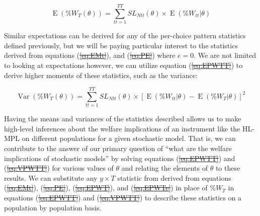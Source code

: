 \documentclass[11pt,a4paper]{report}
\newcommand{\E}{\operatorname{E}}           %
\newcommand{\Var}{\operatorname{Var}}       %
\providecommand{\DIFaddtex}[1]{{\protect\color{blue}\uwave{#1}}} %
\providecommand{\DIFdeltex}[1]{{\protect\color{red}\sout{#1}}}                      %
\providecommand{\DIFaddbegin}{} %
\providecommand{\DIFaddend}{} %
\providecommand{\DIFdelbegin}{} %
\providecommand{\DIFdelend}{} %
\providecommand{\DIFadd}[1]{\texorpdfstring{\DIFaddtex{#1}}{#1}} %
\providecommand{\DIFdel}[1]{\texorpdfstring{\DIFdeltex{#1}}{}} %
\newcommand{\DIFscaledelfig}{0.5}
\newlength{\DIFdelgraphicswidth} %
\newlength{\DIFdelgraphicsheight} %
\newcommand{\DIFaddincludegraphics}[2][]{{\color{blue}\fbox{\DIFOincludegraphics[#1]{#2}}}} %
\newcommand{\DIFdelincludegraphics}[2][]{%
\sbox{\DIFdelgraphicsbox}{\DIFOincludegraphics[#1]{#2}}%
\settoboxwidth{\DIFdelgraphicswidth}{\DIFdelgraphicsbox} %
\settoboxtotalheight{\DIFdelgraphicsheight}{\DIFdelgraphicsbox} %
\scalebox{\DIFscaledelfig}{%
\parbox[b]{\DIFdelgraphicswidth}{\usebox{\DIFdelgraphicsbox}\\[-\baselineskip] \rule{\DIFdelgraphicswidth}{0em}}\llap{\resizebox{\DIFdelgraphicswidth}{\DIFdelgraphicsheight}{%
\setlength{\unitlength}{\DIFdelgraphicswidth}%
\begin{picture}(1,1)%
\thicklines\linethickness{2pt} %
{\color[rgb]{1,0,0}\put(0,0){\framebox(1,1){}}}%
{\color[rgb]{1,0,0}\put(0,0){\line( 1,1){1}}}%
{\color[rgb]{1,0,0}\put(0,1){\line(1,-1){1}}}%
\end{picture}%
}\hspace*{3pt}}} %
} %
\DeclareRobustCommand{\DIFaddbegin}{\DIFOaddbegin \let\includegraphics\DIFaddincludegraphics} %
\DeclareRobustCommand{\DIFaddend}{\DIFOaddend \let\includegraphics\DIFOincludegraphics} %
\DeclareRobustCommand{\DIFdelbegin}{\DIFOdelbegin \let\includegraphics\DIFdelincludegraphics} %
\DeclareRobustCommand{\DIFdelend}{\DIFOaddend \let\includegraphics\DIFOincludegraphics} %
\begin{document}
\begin{equation}
	\DIFdelbegin %
\DIFdelend \DIFaddbegin \label{eq3:EPWTT}
	\DIFaddend \E(\%W_T(\theta)) = \sum_{tt=1}^{TT} \mathit{SL}_{Ntt}(\theta) \times \E(\%W_{tt} | \theta)
\end{equation}

Similar expectations can be derived for any of the per-choice pattern statistics defined previously, but we will be paying particular interest to the statistics derived from equations (\DIFdelbegin \DIFdel{\ref{eq:EMt}}\DIFdelend \DIFaddbegin \DIFadd{\ref{eq3:EMt}}\DIFaddend ), and (\DIFdelbegin \DIFdel{\ref{eq:PE}}\DIFdelend \DIFaddbegin \DIFadd{\ref{eq3:PE}}\DIFaddend ) where $e=0$.
We are not limited to looking at expectations however, we can utilize equation (\DIFdelbegin \DIFdel{\ref{eq:EPWTT}}\DIFdelend \DIFaddbegin \DIFadd{\ref{eq3:EPWTT}}\DIFaddend ) to derive higher moments of these statistics, such as the variance:

\begin{equation}
	\DIFdelbegin %
\DIFdelend \DIFaddbegin \label{eq3:VPWTT}
	\DIFaddend \Var(\%W_T(\theta)) = \sum_{tt=1}^{TT} \mathit{SL}_{Ntt}(\theta) \times \left[ \E(\%W_{tt} | \theta) - \E(\%W_T | \theta) \right]^2
\end{equation}

Having the means and variances of the statistics described allows us to make high-level inferences about the welfare implications of an instrument like the HL-MPL on different populations for a given stochastic model.
That is, we can contribute to the answer of our primary question of \enquote{what are the welfare implications of stochastic models} by solving equations (\DIFdelbegin \DIFdel{\ref{eq:EPWTT}}\DIFdelend \DIFaddbegin \DIFadd{\ref{eq3:EPWTT}}\DIFaddend ) and (\DIFdelbegin \DIFdel{\ref{eq:VPWTT}}\DIFdelend \DIFaddbegin \DIFadd{\ref{eq3:VPWTT}}\DIFaddend ) for various values of $\theta$ and relating the elements of $\theta$ to these results.
We can substitute any  $y \times T$ statistic from derived from equations (\DIFdelbegin \DIFdel{\ref{eq:EMt}}\DIFdelend \DIFaddbegin \DIFadd{\ref{eq3:EMt}}\DIFaddend ), (\DIFdelbegin \DIFdel{\ref{eq:PE}}\DIFdelend \DIFaddbegin \DIFadd{\ref{eq3:PE}}\DIFaddend ), (\DIFdelbegin \DIFdel{\ref{eq:EPWT}}\DIFdelend \DIFaddbegin \DIFadd{\ref{eq3:EWET}}\DIFaddend ), and (\DIFdelbegin \DIFdel{\ref{eq:EPWTe}}\DIFdelend \DIFaddbegin \DIFadd{\ref{eq3:EPWTe}}\DIFaddend ) in place of $\%W_T$ in equations (\DIFdelbegin \DIFdel{\ref{eq:EPWTT}}\DIFdelend \DIFaddbegin \DIFadd{\ref{eq3:EPWTT}}\DIFaddend ) and (\DIFdelbegin \DIFdel{\ref{eq:VPWTT}}\DIFdelend \DIFaddbegin \DIFadd{\ref{eq3:VPWTT}}\DIFaddend ) to describe these statistics on a population by population basis.
\end{document}
